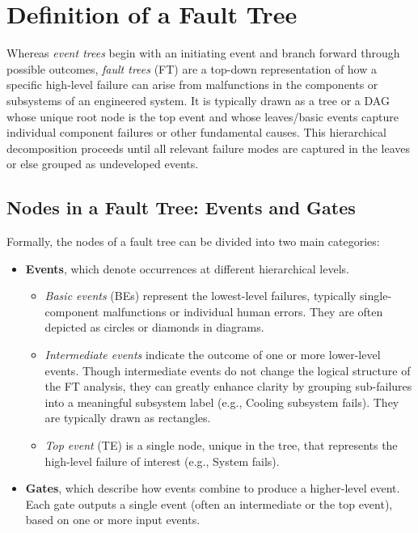 \section{Definition of a Fault Tree}
\label{sec:fault_tree_definition}

Whereas \emph{event trees} begin with an initiating event and branch forward through possible outcomes, \emph{fault trees} (FT) are a top-down representation of how a specific high-level failure can arise from malfunctions in the components or subsystems of an engineered system. It is typically drawn as a tree or a DAG whose unique root node is the top event and whose leaves/basic events capture individual component failures or other fundamental causes. This hierarchical decomposition proceeds until all relevant failure modes are captured in the leaves or else grouped as undeveloped events.

\subsection{Nodes in a Fault Tree: Events and Gates}

Formally, the nodes of a fault tree can be divided into two main categories:  
\begin{itemize}
  \item \textbf{Events}, which denote occurrences at different hierarchical levels.  
    \begin{itemize}
      \item \emph{Basic events} (BEs) represent the lowest-level failures, typically single-component malfunctions or individual human errors. They are often depicted as circles or diamonds in diagrams.  
      \item \emph{Intermediate events} indicate the outcome of one or more lower-level events. Though intermediate events do not change the logical structure of the FT analysis, they can greatly enhance clarity by grouping sub-failures into a meaningful subsystem label (e.g., Cooling subsystem fails). They are typically drawn as rectangles.  
      \item \emph{Top event} (TE) is a single node, unique in the tree, that represents the high-level failure of interest (e.g., System fails).
    \end{itemize}
  \item \textbf{Gates}, which describe how events combine to produce a higher-level event. Each gate outputs a single event (often an intermediate or the top event), based on one or more input events.  
\end{itemize}

